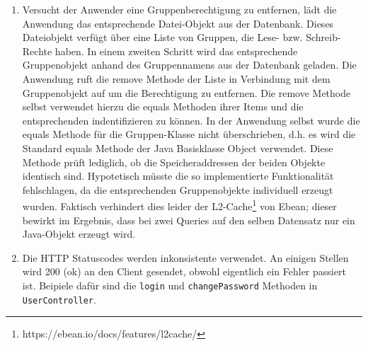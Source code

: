 \documentclass[12pt,DIV14,BCOR10mm,a4paper,parskip=half-,headsepline,headinclude,english,ngerman,bibliography=totocnumbered]{scrreprt}
\begin{document}
\begin{enumerate}
\begin{enumerate}
  \item Versucht der Anwender eine Gruppenberechtigung zu entfernen, lädt die Anwendung das entsprechende Datei-Objekt aus der Datenbank. Dieses Dateiobjekt verfügt über eine Liste von Gruppen, die Lese- bzw. Schreib-Rechte haben. In einem zweiten Schritt wird das entsprechende Gruppenobjekt anhand des Gruppennamens aus der Datenbank geladen. Die Anwendung ruft die remove Methode der Liste in Verbindung mit dem Gruppenobjekt auf um die Berechtigung zu entfernen. Die remove Methode selbst verwendet hierzu die equals Methoden ihrer Items und die entsprechenden indentifizieren zu können. In der Anwendung selbst wurde die equals Methode für die Gruppen-Klasse nicht überschrieben, d.h. es wird die Standard equals Methode der Java Basisklasse Object verwendet. Diese Methode prüft lediglich, ob die Speicheraddressen der beiden Objekte identisch sind. Hypotetisch müsste die so implementierte Funktionalität fehlschlagen, da die entsprechenden Gruppenobjekte individuell erzeugt wurden. Faktisch verhindert dies leider der L2-Cache\footnote{https://ebean.io/docs/features/l2cache/} von Ebean; dieser bewirkt im Ergebnis, dass bei zwei Queries auf den selben Datensatz nur ein Java-Objekt erzeugt wird.
  	\item Die HTTP Statuscodes werden inkonsistente verwendet. An einigen Stellen wird 200 (ok) an den Client gesendet, obwohl eigentlich ein Fehler passiert ist. Beipiele dafür sind die \texttt{login} und \texttt{changePassword} Methoden in \texttt{UserController}.
  
\end{enumerate}

\printbibliography

\printacronyms[title=Abkürzungsverzeichnis,toctitle=Abkürzungsverzeichnis]
\printglossary[title=Glossar,toctitle=Glossar,type=main]

\iftotalfigures
  \listoffigures
\fi


\begin{appendices}



\end{appendices}
\end{enumerate}
\end{document}
